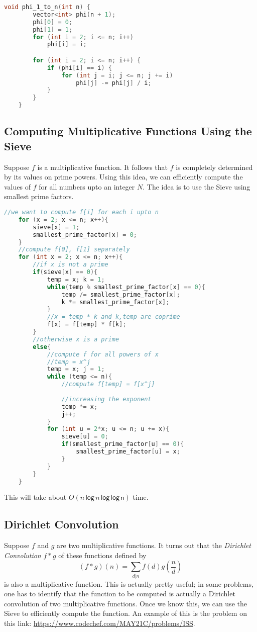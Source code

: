 \documentclass[12pt,a4paper]{amsart}
\numberwithin{equation}{section}
\theoremstyle{definition}
\begin{document}
\begin{lstlisting}[language=C++]
    void phi_1_to_n(int n) {
        vector<int> phi(n + 1);
        phi[0] = 0;
        phi[1] = 1;
        for (int i = 2; i <= n; i++)
            phi[i] = i;

        for (int i = 2; i <= n; i++) {
            if (phi[i] == i) {
                for (int j = i; j <= n; j += i)
                    phi[j] -= phi[j] / i;
            }
        }
    }
\end{lstlisting}

\subsection{Computing Multiplicative Functions Using the Sieve} Suppose $f$ is a multiplicative function. It follows that $f$ is completely determined by its values on prime powers. Using this idea, we can efficiently compute the values of $f$ for all numbers upto an integer $N$. The idea is to use the Sieve using smallest prime factors. 

\begin{lstlisting}[language=C++]
    //we want to compute f[i] for each i upto n
    for (x = 2; x <= n; x++){
        sieve[x] = 1;
        smallest_prime_factor[x] = 0;
    }
    //compute f[0], f[1] separately
    for (int x = 2; x <= n; x++){
        //if x is not a prime
        if(sieve[x] == 0){
            temp = x; k = 1;
            while(temp % smallest_prime_factor[x] == 0){
                temp /= smallest_prime_factor[x];
                k *= smallest_prime_factor[x];
            }
            //x = temp * k and k,temp are coprime
            f[x] = f[temp] * f[k];
        }
        //otherwise x is a prime
        else{
            //compute f for all powers of x
            //temp = x^j
            temp = x; j = 1;
            while (temp <= n){
                //compute f[temp] = f[x^j]
                
                //increasing the exponent
                temp *= x;
                j++;
            }
            for (int u = 2*x; u <= n; u += x){
                sieve[u] = 0;
                if(smallest_prime_factor[u] == 0){
                    smallest_prime_factor[u] = x;
                }
            }
        }
    }    
\end{lstlisting}

This will take about $O(n\,\mathsf{log\,}n\,\mathsf{log\,log\,n})$ time. 

\subsection{Dirichlet Convolution} Suppose $f$ and $g$ are two multiplicative functions. It turns out that the \textit{Dirichlet Convolution} $f*g$ of these functions defined by 
$$(f*g)(n) = \sum_{d|n}f(d)g\left(\dfrac{n}{d}\right)$$
is also a multiplicative function. This is actually pretty useful; in some problems, one has to identify that the function to be computed is actually a Dirichlet convolution of two multiplicative functions. Once we know this, we can use the Sieve to efficiently compute the function. An example of this is the problem on this link: \url{https://www.codechef.com/MAY21C/problems/ISS}.
\end{document}
